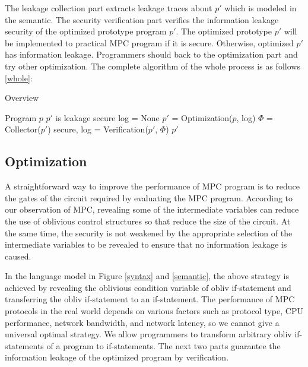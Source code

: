 The leakage collection part extracts leakage traces about $p'$ which is modeled in the semantic.
The security verification part verifies the information leakage security of the optimized prototype program $p'$.
The optimized prototype $p'$ will be implemented to practical MPC program if it is secure.
Otherwise, optimized $p'$ has information leakage. Programmers should back to the optimization part and try other optimization.
The complete algorithm of the whole process is as follows \ref{whole}:
\begin{algorithm}[ht]
    \label{whole}
    \caption{Overview}
    \begin{algorithmic}
    \Require Program $p$
    \Ensure $p'$ is leakage secure
    \State log = None
        \State $p'$ = Optimization($p$, log)
        \State $\Phi$ = Collector($p'$)
        \State secure, log = Verification($p'$, $\Phi$)
            \State \Return $p'$
        \EndIf
    \EndWhile
    \end{algorithmic}
\end{algorithm}

\subsection{Optimization}
A straightforward way to improve the performance of MPC program is to reduce the gates of the circuit required by evaluating the MPC program.
According to our observation of MPC, revealing some of the intermediate variables can reduce the use of oblivious control structures so that reduce the size of the circuit.
At the same time, the security is not weakened by the appropriate selection of the intermediate variables to be revealed to ensure that no information leakage is caused.

In the language model in Figure \ref{syntax} and \ref{semantic}, the above strategy is achieved by revealing the oblivious condition variable of obliv if-statement and transferring the obliv if-statement to an if-statement.
The performance of MPC protocols in the real world depends on various factors such as protocol type, CPU performance, network bandwidth, and network latency, so we cannot give a universal optimal strategy.
We allow programmers to transform arbitrary obliv if-statements of a program to if-statements.
The next two parts guarantee the information leakage of the optimized program by verification.

